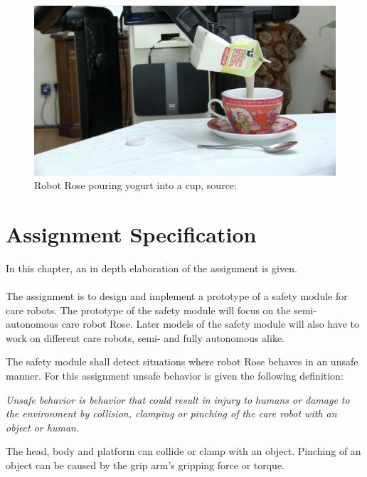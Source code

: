 \documentclass[12pt]{scrreprt}
\begin{document}
\begin{figure}[H]
    \centering
    \includegraphics[width=\textwidth]{Figures/pouring_milk_into_a_cup.jpg}
    \caption{Robot Rose pouring yogurt into a cup, source: \cite{rose_specification}}
    \label{fig:rose_milking}
\end{figure}

\chapter{Assignment Specification}

\label{Assignment specification}

In this chapter, an in depth elaboration of the assignment is given.
\\\\
The assignment is to design and implement a prototype of a safety module for care robots. The prototype of the safety module will focus on the semi-autonomous care robot Rose. Later models of the safety module will also have to work on different care robots, semi- and fully autonomous alike.
\par
The safety module shall detect situations where robot Rose behaves in an unsafe manner. For this assignment unsafe behavior is given the following definition:
\begin{flushleft}
\textit{
Unsafe behavior is behavior that could result in injury to humans or damage to the environment by collision, clamping or pinching of the care robot with an object or human.
}
\end{flushleft}
The head, body and platform can collide or clamp with an object. Pinching of an object can be caused by the grip arm's gripping force or torque. %
 
\end{document}
